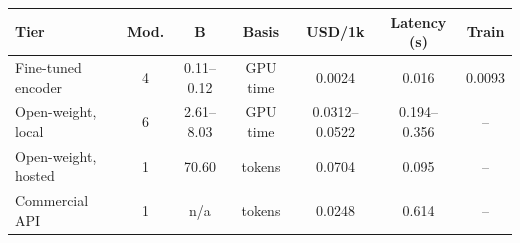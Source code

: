 \setlength{\tabcolsep}{2.0pt}
\renewcommand{\arraystretch}{1.05}
\scriptsize
\begin{tabular}{@{}lcccccc@{}}
\toprule
\textbf{Tier} & \textbf{Mod.} & \textbf{B} & \textbf{Basis} & \textbf{USD/1k} & \textbf{Latency (s)} & \textbf{Train} \\
\midrule
Fine-tuned encoder & 4 & 0.11--0.12 & GPU time & 0.0024 & 0.016 & 0.0093 \\
Open-weight, local & 6 & 2.61--8.03 & GPU time & 0.0312--0.0522 & 0.194--0.356 & -- \\
Open-weight, hosted & 1 & 70.60 & tokens & 0.0704 & 0.095 & -- \\
Commercial API & 1 & n/a & tokens & 0.0248 & 0.614 & -- \\
\bottomrule
\end{tabular}
